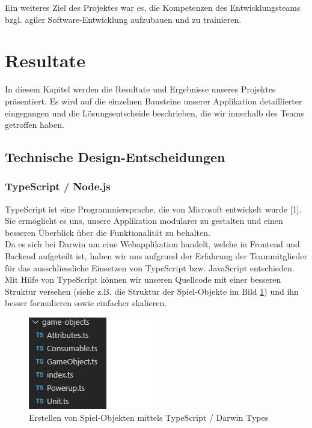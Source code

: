 \documentclass[11pt,a4paper,titlepage]{article}
\begin{document}
Ein weiteres Ziel des Projektes war es, die Kompetenzen des Entwicklungsteams bzgl. agiler Software-Entwicklung aufzubauen und zu trainieren.

\newpage

\section{Resultate}
In diesem Kapitel werden die Resultate und Ergebnisse unseres Projektes präsentiert.
Es wird auf die einzelnen Bausteine unserer Applikation detaillierter eingegangen und die Lösungsentscheide beschrieben, die wir innerhalb des Teams getroffen haben.

\subsection{Technische Design-Entscheidungen}
\subsubsection{TypeScript / Node.js}
TypeScript ist eine Programmiersprache, die von Microsoft entwickelt wurde [1]. Sie ermöglicht es uns, unsere Applikation modularer zu gestalten und einen besseren Überblick über die Funktionalität zu behalten.\\
Da es sich bei Darwin um eine Webapplikation handelt, welche in Frontend und Backend aufgeteilt ist, haben wir uns aufgrund der Erfahrung der Teammitglieder für das ausschliessliche Einsetzen von TypeScript bzw. JavaScript entschieden.
Mit Hilfe von TypeScript können wir unseren Quellcode mit einer besseren Struktur versehen (siehe z.B. die Struktur der Spiel-Objekte im Bild \ref{types}) und ihn besser formulieren sowie einfacher skalieren.

\begin{figure}[H]
	\centering
	\includegraphics{darwintypes.png}
	\caption{Erstellen von Spiel-Objekten mittels TypeScript / Darwin Types}
	\label{types}
\end{figure}
\end{document}
